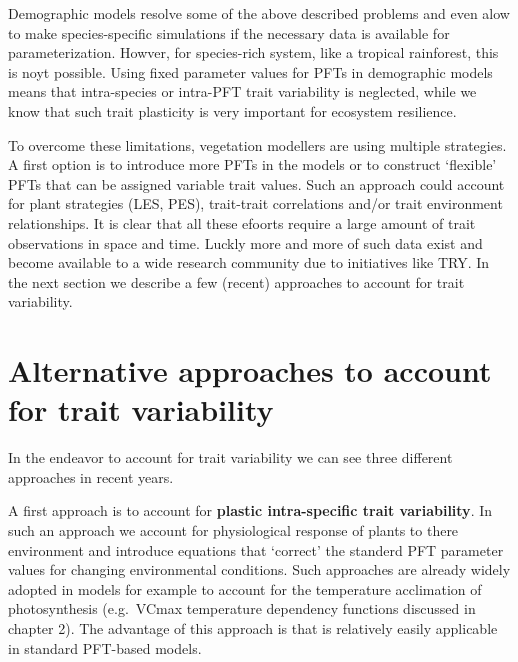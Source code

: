 \documentclass[12pt,oneside]{book}
\begin{document}
Demographic models resolve some of the above described problems and even
alow to make species-specific simulations if the necessary data is
available for parameterization. Howver, for species-rich system, like a
tropical rainforest, this is noyt possible. Using fixed parameter values
for PFTs in demographic models means that intra-species or intra-PFT
trait variability is neglected, while we know that such trait plasticity
is very important for ecosystem resilience.

To overcome these limitations, vegetation modellers are using multiple
strategies. A first option is to introduce more PFTs in the models or to
construct `flexible' PFTs that can be assigned variable trait values.
Such an approach could account for plant strategies (LES, PES),
trait-trait correlations and/or trait environment relationships. It is
clear that all these efoorts require a large amount of trait
observations in space and time. Luckly more and more of such data exist
and become available to a wide research community due to initiatives
like TRY. In the next section we describe a few (recent) approaches to
account for trait variability.

\section{Alternative approaches to account for trait
variability}\label{alternative-approaches-to-account-for-trait-variability}

In the endeavor to account for trait variability we can see three
different approaches in recent years.

A first approach is to account for \textbf{plastic intra-specific trait
variability}. In such an approach we account for physiological response
of plants to there environment and introduce equations that `correct'
the standerd PFT parameter values for changing environmental conditions.
Such approaches are already widely adopted in models for example to
account for the temperature acclimation of photosynthesis (e.g.~VCmax
temperature dependency functions discussed in chapter 2). The advantage
of this approach is that is relatively easily applicable in standard
PFT-based models.
\end{document}
